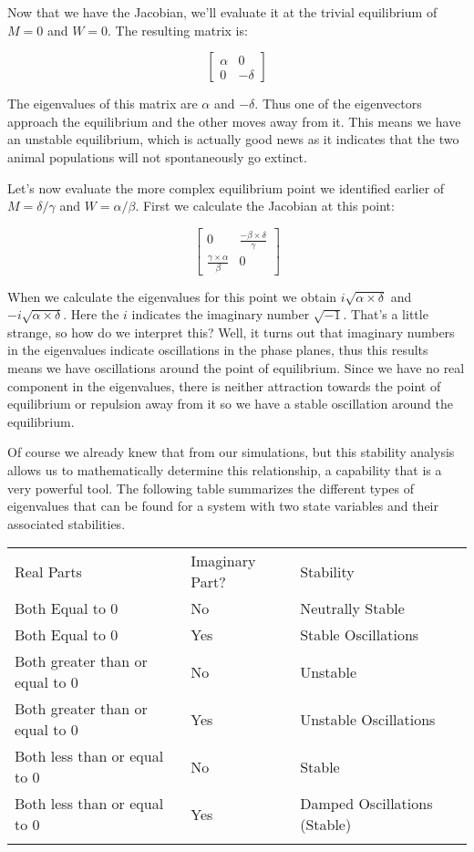 \documentclass[]{memoir}
\begin{document}
Now that we have the Jacobian, we'll evaluate it at the trivial
equilibrium of $M=0$ and $W=0$. The resulting matrix is:

\[
\begin{bmatrix}
\alpha  & 0 \\
0 & -\delta
\end{bmatrix}
\]

The eigenvalues of this matrix are $\alpha$ and $-\delta$. Thus one of
the eigenvectors approach the equilibrium and the other moves away from
it. This means we have an unstable equilibrium, which is actually good
news as it indicates that the two animal populations will not
spontaneously go extinct.

Let's now evaluate the more complex equilibrium point we identified
earlier of $M=\delta/\gamma$ and $W=\alpha/\beta$. First we calculate
the Jacobian at this point:

\[
\begin{bmatrix}
0 & \frac{-\beta \times \delta}{\gamma} \\
\frac{\gamma \times \alpha}{\beta} & 0
\end{bmatrix}
\]

When we calculate the eigenvalues for this point we obtain
$i\sqrt{\alpha \times \delta}$ and $-i\sqrt{\alpha \times \delta}$. Here
the $i$ indicates the imaginary number $\sqrt{-1}$. That's a little
strange, so how do we interpret this? Well, it turns out that imaginary
numbers in the eigenvalues indicate oscillations in the phase planes,
thus this results means we have oscillations around the point of
equilibrium. Since we have no real component in the eigenvalues, there
is neither attraction towards the point of equilibrium or repulsion away
from it so we have a stable oscillation around the equilibrium.

Of course we already knew that from our simulations, but this stability
analysis allows us to mathematically determine this relationship, a
capability that is a very powerful tool. The following table summarizes
the different types of eigenvalues that can be found for a system with
two state variables and their associated stabilities.

\begin{longtable}[c]{@{}lll@{}}
\hline\noalign{\medskip}
Real Parts & Imaginary Part? & Stability
\\\noalign{\medskip}
\hline\noalign{\medskip}
Both Equal to 0 & No & Neutrally Stable
\\\noalign{\medskip}
Both Equal to 0 & Yes & Stable Oscillations
\\\noalign{\medskip}
Both greater than or equal to 0 & No & Unstable
\\\noalign{\medskip}
Both greater than or equal to 0 & Yes & Unstable Oscillations
\\\noalign{\medskip}
Both less than or equal to 0 & No & Stable
\\\noalign{\medskip}
Both less than or equal to 0 & Yes & Damped Oscillations (Stable)
\\\noalign{\medskip}
\hline
\end{longtable}
\end{document}
